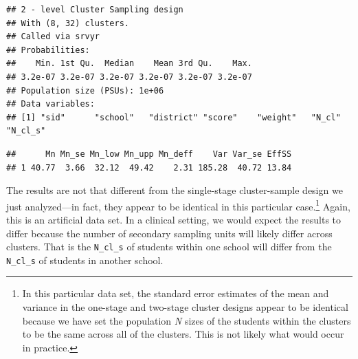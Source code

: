 \documentclass[
]{article}
\newenvironment{Shaded}{\begin{snugshade}}{\end{snugshade}}
\newcommand{\DataTypeTok}[1]{\textcolor[rgb]{0.13,0.29,0.53}{#1}}
\newcommand{\DecValTok}[1]{\textcolor[rgb]{0.00,0.00,0.81}{#1}}
\newcommand{\KeywordTok}[1]{\textcolor[rgb]{0.13,0.29,0.53}{\textbf{#1}}}
\newcommand{\NormalTok}[1]{#1}
\newcommand{\OperatorTok}[1]{\textcolor[rgb]{0.81,0.36,0.00}{\textbf{#1}}}
\newcommand{\OtherTok}[1]{\textcolor[rgb]{0.56,0.35,0.01}{#1}}
\newcommand{\StringTok}[1]{\textcolor[rgb]{0.31,0.60,0.02}{#1}}
\begin{document}
\begin{verbatim}
## 2 - level Cluster Sampling design
## With (8, 32) clusters.
## Called via srvyr
## Probabilities:
##    Min. 1st Qu.  Median    Mean 3rd Qu.    Max. 
## 3.2e-07 3.2e-07 3.2e-07 3.2e-07 3.2e-07 3.2e-07 
## Population size (PSUs): 1e+06 
## Data variables:
## [1] "sid"      "school"   "district" "score"    "weight"   "N_cl"     "N_cl_s"
\end{verbatim}

\begin{Shaded}
\end{Shaded}

\begin{verbatim}
##      Mn Mn_se Mn_low Mn_upp Mn_deff    Var Var_se EffSS
## 1 40.77  3.66  32.12  49.42    2.31 185.28  40.72 13.84
\end{verbatim}

The results are not that different from the single-stage cluster-sample design we just analyzed---in fact, they appear to be identical in this particular case.\footnote{In this particular data set, the standard error estimates of the mean and variance in the one-stage and two-stage cluster designs appear to be identical because we have set the population \emph{N} sizes of the students within the clusters to be the same across all of the clusters. This is not likely what would occur in practice.} Again, this is an artificial data set. In a clinical setting, we would expect the results to differ because the number of secondary sampling units will likely differ across clusters. That is the \texttt{N\_cl\_s} of students within one school will differ from the \texttt{N\_cl\_s} of students in another school.
\end{document}
